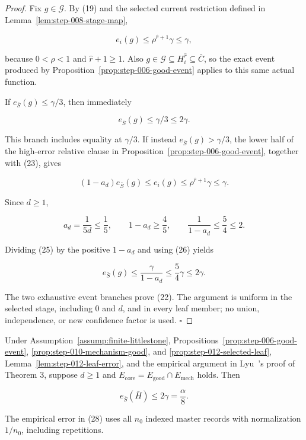 \begin{proof}
Fix \(g\in\mathcal G\). By (19) and the selected current restriction
defined in Lemma~\ref{lem:step-008-stage-map},

\[
 e_i(g)\le\rho^{\widehat r+1}\gamma\le\gamma,
\tag{23}
\]

because \(0<\rho<1\) and \(\widehat r+1\ge1\). Also
\(g\in\mathcal G\subseteq H_i^{\widehat r}\subseteq\bar C\), so the exact
event produced by Proposition~\ref{prop:step-006-good-event} applies to this
same actual function.

If \(e_{\bar S}(g)\le\gamma/3\), then immediately

\[
 e_{\bar S}(g)\le\gamma/3\le2\gamma.
\tag{24}
\]

This branch includes equality at \(\gamma/3\). If instead
\(e_{\bar S}(g)>\gamma/3\), the lower half of the high-error relative
clause in Proposition~\ref{prop:step-006-good-event}, together with (23),
gives

\[
 (1-a_d)e_{\bar S}(g)
 \le e_i(g)
 \le\rho^{\widehat r+1}\gamma
 \le\gamma.
\tag{25}
\]

Since \(d\ge1\),

\[
 a_d=\frac1{5d}\le\frac15,
 \qquad
 1-a_d\ge\frac45,
 \qquad
 \frac1{1-a_d}\le\frac54\le2.
\tag{26}
\]

Dividing (25) by the positive \(1-a_d\) and using (26) yields

\[
 e_{\bar S}(g)
 \le\frac{\gamma}{1-a_d}
 \le\frac54\gamma
 \le2\gamma.
\tag{27}
\]

The two exhaustive event branches prove (22). The argument is uniform in
the selected stage, including \(0\) and \(d\), and in every leaf member;
no union, independence, or new confidence factor is used. \(\square\)


\end{proof}

\begin{lemma}\label{lem:step-012-empirical}
Under Assumption~\ref{assump:finite-littlestone},
Propositions~\ref{prop:step-006-good-event},
\ref{prop:step-010-mechanism-good}, and
\ref{prop:step-012-selected-leaf},
Lemma~\ref{lem:step-012-leaf-error}, and the empirical argument in
Lyu~\citep{lyu2025}'s proof of Theorem 3, suppose \(d\ge1\) and
\(E_{\mathrm{core}}=E_{\mathrm{good}}\cap E_{\mathrm{mech}}\) holds. Then

\[
 e_{\bar S}(\bar H)\le2\gamma=\frac{\alpha}{8}.
\tag{28}
\]

The empirical error in (28) uses all \(n_0\) indexed master records with
normalization \(1/n_0\), including repetitions.


\end{lemma}

